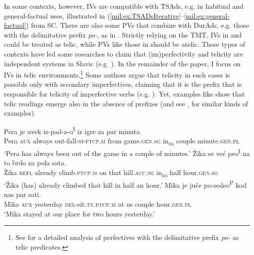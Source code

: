 \documentclass[output=paper,colorlinks,citecolor=brown]{langscibook}
\begin{document}
\noindent In some contexts, however, IVs are compatible with TSAds, e.g. in habitual and general-factual uses, illustrated in (\ref{mil:ex:TSADsIterative}--\ref{mil:ex:general-factual}) from SC. There are also some PVs that combine with DurAds, e.g. those with the delimitative prefix \textit{po-}, as in . Strictly relying on the TMT, IVs in  and  could be treated as telic, while PVs like those in  should be atelic. These types of contexts have led some researches to claim that (im)perfectivity and telicity are independent systems in Slavic (e.g. \citealt{Borik_2006, Gehrke2008, Gehrke2008b, Ramchand2008, Stanojević2012, FleischhauerGabrovska2019}). In the remainder of the paper, I focus on IVs in telic environments.\footnote{See \citet{Milosavljević2022} for a detailed analysis of perfectives with the delimitative prefix \textit{po-} as telic predicates.} Some authors argue that telicity in such cases is possible only with secondary imperfectives,  claiming that it is the prefix that is responsible for telicity of imperfective verbs (e.g. \citealt{Stanojević2012, FleischhauerGabrovska2019}). Yet, examples like  show that telic readings emerge also in the absence of prefixes (and see \citealt{Pereltsvaig2000, Szucsich2000, Szucsich2001, BraginskyRothstein2008},  for similar kinds of examples).

\ea \label{mil:ex:TSADsIterative}
\gll Pera	je	uvek	iz-pad-a-o\textsuperscript{I}	iz	igre	za	par	minuta.\\ Pera	\textsc{aux}	always	out-fall-\textsc{si-ptcp.m}		from	game.\textsc{gen.sg}	in\textsubscript{za}	couple	minute.\textsc{gen.pl}
     \\
\glt `Pera has always been out of the game in a couple of minutes.'
\ex \label{mil:ex:general-factual}
\gll Žika	se	već	peo\textsuperscript{I}	na	to	brdo	za	pola	sata.\\ Žika	\textsc{refl}	already	climb.\textsc{ptcp.m}	on	that	hill.\textsc{acc.sg}	in\textsubscript{za}	half	hour.\textsc{gen.sg}
     \\
\glt `Žika (has) already climbed that hill in half an hour.'
\ex \label{mil:ex:delimitative}
\gll Mika je juče po-sedeo\textsuperscript{P}	kod nas par sati.\\ Mika	\textsc{aux}	yesterday	\textsc{del}-sit.\textsc{tv.ptcp.m}	at us couple hour.\textsc{gen.pl}
     \\
\glt `Mika stayed at our place for two hours yesterday.’
\z
\end{document}
